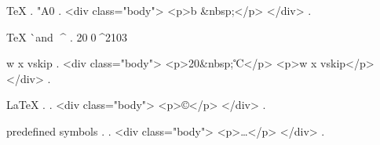 TeX \char
.
 \char"A0
.
<div class="body">
<p>b &nbsp;</p>
</div>
.

TeX ^^ and ^^^^
.
20^^A0^^^^2103

^^7 ^^78 vs^^+ip
.
<div class="body">
<p>20&nbsp;℃</p>
<p>w x vskip</p>
</div>
.


LaTeX \symbol{}
.
.
<div class="body">
<p>©</p>
</div>
.


predefined symbols
.
\textellipsis
.
<div class="body">
<p>…</p>
</div>
.